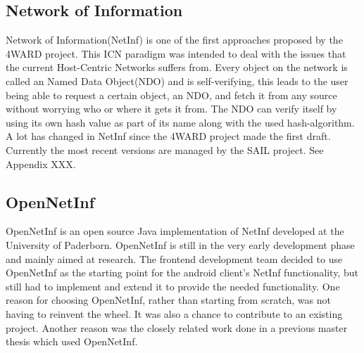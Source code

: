 \subsection{Network of Information}
Network of Information(NetInf) is one of the first approaches proposed by the 4WARD project. \cite{4ward} This ICN paradigm was intended to deal with the issues that the current Host-Centric Networks suffers from. Every object on the network is called an Named Data Object(NDO) and is self-verifying, this leads to the user being able to request a certain object, an NDO, and fetch it from any source without worrying who or where it gets it from. The NDO can verify itself by using its own hash value as part of its name along with the used hash-algorithm.
A lot has changed in NetInf since the 4WARD project made the first draft. Currently the most recent versions are managed by the SAIL project. See Appendix XXX.

\subsection{OpenNetInf}
OpenNetInf \cite{opennetinf} is an open source Java implementation of NetInf  developed at the University of Paderborn. OpenNetInf is still in the very early development phase and mainly aimed at research. The frontend development team decided to use OpenNetInf as the starting point for the android client's NetInf functionality, but still had to implement and extend it to provide the needed functionality. One reason for choosing OpenNetInf, rather than starting from scratch, was not having to reinvent the wheel. It was also a chance to contribute to an existing project. Another reason was the closely related work done in a previous master thesis \cite{masterthesis} which used OpenNetInf.
